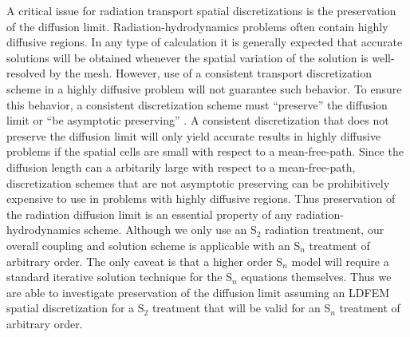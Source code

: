\documentclass[preprint,12pt]{elsarticle}
\begin{document}
  
A critical issue for radiation transport spatial discretizations is the preservation of the diffusion limit.  
Radiation-hydrodynamics problems often contain highly diffusive regions.  In any type of calculation it is generally expected that accurate solutions will be obtained whenever the spatial variation of the solution is well-resolved by the mesh.  However, use of a consistent transport discretization scheme in a highly diffusive problem will not guarantee such behavior.  To ensure this behavior, a consistent discretization scheme must ``preserve'' the diffusion limit 
or ``be asymptotic preserving'' \cite{larsenmorel}.  A consistent discretization that does not preserve the diffusion limit will only yield accurate results in highly diffusive problems if the spatial cells are small with respect to a mean-free-path.  Since the diffusion length can a arbitarily large with respect to a mean-free-path, discretization schemes that are not asymptotic preserving can be prohibitively expensive to use in problems with highly diffusive regions. Thus preservation of the radiation diffusion limit is an essential property of any radiation-hydrodynamics scheme.  Although we only use an S$_2$ radiation treatment, our overall coupling and solution scheme is applicable with an S$_n$ treatment of arbitrary order.  The only 
caveat is that a higher order S$_n$ model will require a standard iterative solution technique for the S$_n$ 
equations themselves. Thus we are able to investigate preservation of the diffusion limit assuming an LDFEM spatial discretization for a S$_2$ treatment that 
will be valid for an S$_n$ treatment of arbitrary order.  
\end{document}
